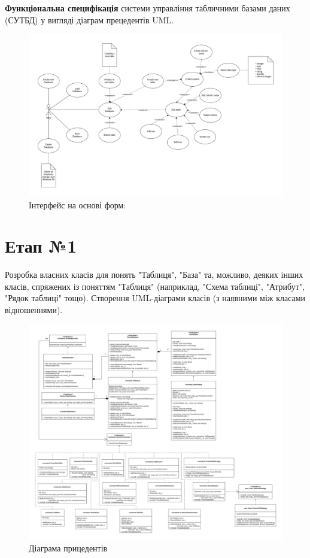 \documentclass[a4paper, 12pt]{article}
\begin{document}
\textbf{Функціональна специфікація} системи управління табличними базами даних (СУТБД) у вигляді діаграм прецедентів UML.

\begin{figure}[H]
\centering
\includegraphics[scale=0.4]{../diagrams/use_case.png}
\caption{Інтерфейс на основі форм:}
\end{figure}

\section{Етап №1}
Розробка власних класів для понять "Таблиця", "База" та, можливо, деяких інших класів, спряжених із поняттям "Таблиця" (наприклад, "Схема таблиці", "Атрибут", "Рядок таблиці" тощо). Створення UML-діаграми класів (з наявними між класами відношеннями).

\begin{figure}[H]
\centering
\includegraphics[scale=0.3]{../diagrams/IT_UML_DIAGRAM.png}
\caption{Діаграма прицедентів}
\end{figure}
\end{document}
